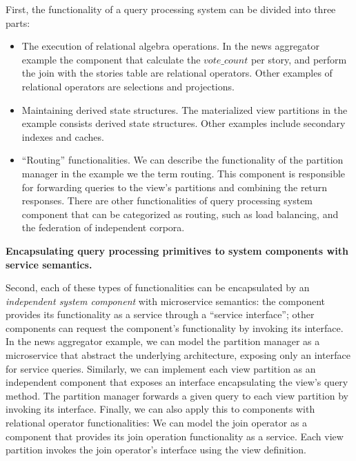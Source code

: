 \noindent
First, the functionality of a query processing system can be divided into three parts:
\begin{itemize}
  \item The execution of relational algebra operations.
  In the news aggregator example the component that calculate the $vote\_count$ per story,
  and perform the join with the stories table are relational operators.
  Other examples of relational operators are selections and projections.

  \item Maintaining derived state structures.
  The materialized view partitions in the example consists derived state structures.
  Other examples include secondary indexes and caches.

  \item ``Routing'' functionalities.
  We can describe the functionality of the partition manager in the example we the term routing.
  This component is responsible for forwarding queries to the view's partitions and combining the return responses.
  There are other functionalities of query processing system component that can be categorized as routing,
  such as load balancing, and the federation of independent corpora.
\end{itemize}

\vspace{12pt}
\noindent
\textbf{Encapsulating query processing primitives to system components with service semantics.}

\noindent
Second, each of these types of functionalities can be encapsulated by an \textit{independent system component} with microservice semantics:
the component provides its functionality as a service through a ``service interface'';
other components can request the component's functionality by invoking its interface.
In the news aggregator example,
we can model the partition manager as a microservice that abstract the underlying architecture,
exposing only an interface for service queries.
Similarly,
we can implement each view partition as an independent component that exposes an interface encapsulating the view's query method.
The partition manager forwards a given query to each view partition by invoking its interface.
Finally, we can also apply this to components with relational operator functionalities:
We can model the join operator as a component that provides its join operation functionality as a service.
Each view partition invokes the join operator's interface using the view definition.

